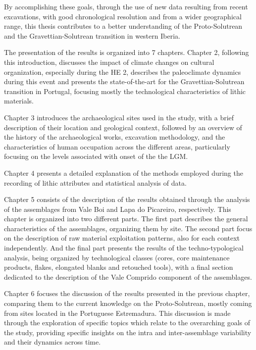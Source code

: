 \documentclass[12pt,twoside]{reedthesis}
\begin{document}
By accomplishing these goals, through the use of new data resulting from recent excavations, with good chronological resolution and from a wider geographical range, this thesis contributes to a better understanding of the Proto-Solutrean and the Gravettian-Solutrean transition in western Iberia.

The presentation of the results is organized into 7 chapters. Chapter 2, following this introduction, discusses the impact of climate changes on cultural organization, especially during the HE 2, describes the paleoclimate dynamics during this event and presents the state-of-the-art for the Gravettian-Solutrean transition in Portugal, focusing mostly the technological characteristics of lithic materials.

Chapter 3 introduces the archaeological sites used in the study, with a brief description of their location and geological context, followed by an overview of the history of the archaeological works, excavation methodology, and the characteristics of human occupation across the different areas, particularly focusing on the levels associated with onset of the the LGM.

Chapter 4 presents a detailed explanation of the methods employed during the recording of lithic attributes and statistical analysis of data.

Chapter 5 consists of the description of the results obtained through the analysis of the assemblages from Vale Boi and Lapa do Picareiro, respectively. This chapter is organized into two different parts. The first part describes the general characteristics of the assemblages, organizing them by site. The second part focus on the description of raw material exploitation patterns, also for each context independently. And the final part presents the results of the techno-typological analysis, being organized by technological classes (cores, core maintenance products, flakes, elongated blanks and retouched tools), with a final section dedicated to the description of the Vale Comprido component of the assemblages.

Chapter 6 focuses the discussion of the results presented in the previous chapter, comparing them to the current knowledge on the Proto-Solutrean, mostly coming from sites located in the Portuguese Estremadura. This discussion is made through the exploration of specific topics which relate to the overarching goals of the study, providing specific insights on the intra and inter-assemblage variability and their dynamics across time.
\end{document}

